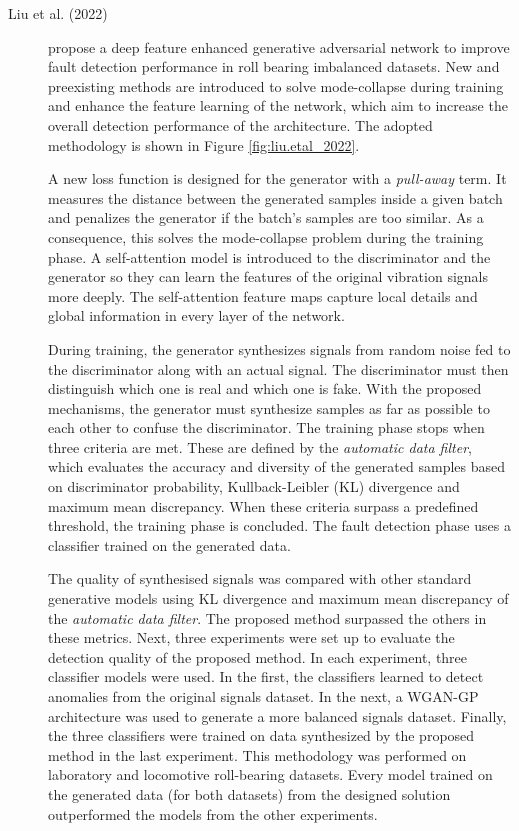 \begin{description}
    \item[Liu et al. (2022) \cite{liu.etal_DataSynthesisUsing_2022}] propose a deep feature enhanced generative adversarial network to improve fault detection performance in roll bearing imbalanced datasets. New and preexisting methods are introduced to solve mode-collapse during training and enhance the feature learning of the network, which aim to increase the overall detection performance of the architecture. The adopted methodology is shown in Figure \ref{fig:liu.etal_2022}.

    A new loss function is designed for the generator with a \textit{pull-away} term. It measures the distance between the generated samples inside a given batch and penalizes the generator if the batch's samples are too similar. As a consequence, this solves the mode-collapse problem during the training phase. A self-attention model is introduced to the discriminator and the generator so they can learn the features of the original vibration signals more deeply. The self-attention feature maps capture local details and global information in every layer of the network.

    During training, the generator synthesizes signals from random noise fed to the discriminator along with an actual signal. The discriminator must then distinguish which one is real and which one is fake. With the proposed mechanisms, the generator must synthesize samples as far as possible to each other to confuse the discriminator. The training phase stops when three criteria are met. These are defined by the \textit{automatic data filter}, which evaluates the accuracy and diversity of the generated samples based on discriminator probability, Kullback-Leibler (KL) divergence and maximum mean discrepancy.  When these criteria surpass a predefined threshold, the training phase is concluded. The fault detection phase uses a classifier trained on the generated data.  

    The quality of synthesised signals was compared with other standard generative models using KL divergence and maximum mean discrepancy of the \textit{automatic data filter}. The proposed method surpassed the others in these metrics. Next, three experiments were set up to evaluate the detection quality of the proposed method. In each experiment, three classifier models were used. In the first, the classifiers learned to detect anomalies from the original signals dataset. In the next, a WGAN-GP architecture was used to generate a more balanced signals dataset. Finally, the three classifiers were trained on data synthesized by the proposed method in the last experiment. This methodology was performed on laboratory and locomotive roll-bearing datasets. Every model trained on the generated data (for both datasets) from the designed solution outperformed the models from the other experiments.

    
\end{description}

